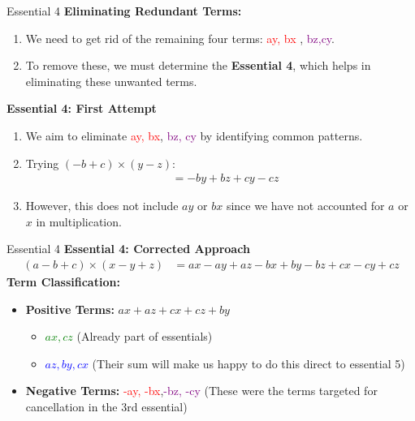 \documentclass{beamer}
\begin{document}
\begin{frame}{Essential 4}
    \textbf{Eliminating Redundant Terms:}
    \begin{enumerate}
        \item We need to get rid of the remaining four terms: \textcolor{red}{ay, bx} , \textcolor{purple}{bz,cy}.
        \item To remove these, we must determine the \textbf{Essential 4}, which helps in eliminating these unwanted terms.
    \end{enumerate}
    \textbf{Essential 4: First Attempt}
    \begin{enumerate}
        \item We aim to eliminate \textcolor{red}{ay, bx}, \textcolor{purple}{bz, cy} by identifying common patterns.
        \item Trying $(-b + c) \times (y - z)$:
        \begin{align*}
            &= -by + bz + cy - cz
        \end{align*}
        \item However, this does not include $ay$ or $bx$ since we have not accounted for $a$ or $x$ in multiplication.
    \end{enumerate}
\end{frame}
\begin{frame}{Essential 4}
    \textbf{Essential 4: Corrected Approach}
    \begin{align*}
        (a - b + c) \times (x - y + z) &= ax - ay + az - bx + by - bz + cx - cy + cz
    \end{align*}
    \textbf{Term Classification:}
    \begin{itemize}
        \item \textbf{Positive Terms:} $ax + az + cx + cz + by$
        \begin{itemize}
            \item \textcolor{green}{$ax, cz$} (Already part of essentials)
            \item \textcolor{blue}{$az, by, cx$} (Their sum will make us happy to do this direct to essential 5)
        \end{itemize}
        \item \textbf{Negative Terms:} \textcolor{red}{-ay, -bx},\textcolor{purple}{-bz, -cy} (These were the terms targeted for cancellation in the 3rd essential)
    \end{itemize}
\end{frame}
\end{document}
